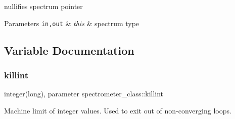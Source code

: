 nullifies spectrum pointer 


\begin{DoxyParams}[1]{Parameters}
\mbox{\tt in,out}  & {\em this} & spectrum type \\
\hline
\end{DoxyParams}


\subsection{Variable Documentation}
\mbox{\label{namespacespectrometer__class_a5564f6a94902c50fefd03dd3f5ec4e47}} 
\subsubsection{\texorpdfstring{killint}{killint}}
{\footnotesize\ttfamily integer(long), parameter spectrometer\+\_\+class\+::killint\hspace{0.3cm}{\ttfamily [private]}}



Machine limit of integer values. Used to exit out of non-\/converging loops. 

